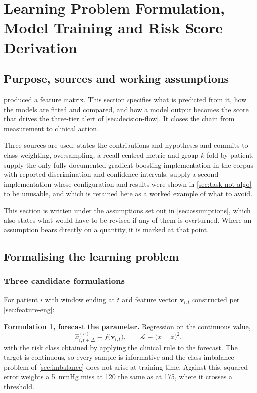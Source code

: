 \documentclass[12pt,a4paper,oneside]{report}
\begin{document}
\section{Learning Problem Formulation, Model Training and Risk Score Derivation}\label{sec:learning}

\subsection*{Purpose, sources and working assumptions}

 produced a feature matrix. This section specifies what is predicted from it, how the models are fitted and compared, and how a model output becomes the score that drives the three-tier alert of \cref{sec:decision-flow}. It closes the chain from measurement to clinical action.

Three sources are used. \Textcite{cadrage2026} states the contributions and hypotheses and commits to class weighting, oversampling, a recall-centred metric and group $k$-fold by patient. \Textcite{mendoza2025} supply the only fully documented gradient-boosting implementation in the corpus with reported discrimination and confidence intervals. \Textcite{efendi2025} supply a second implementation whose configuration and results were shown in \cref{sec:task-not-algo} to be unusable, and which is retained here as a worked example of what to avoid.

This section is written under the assumptions set out in \cref{sec:assumptions}, which also states what would have to be revised if any of them is overturned. Where an assumption bears directly on a quantity, it is marked at that point.

\subsection{Formalising the learning problem}\label{sec:formulation}

\subsubsection{Three candidate formulations}

For patient $i$ with window ending at $t$ and feature vector $\mathbf{v}_{i,t}$ constructed per \cref{sec:feature-eng}:

\textbf{Formulation 1, forecast the parameter.} Regression on the continuous value,
\begin{equation}
  \hat{x}^{(c)}_{i,t+\Delta} = f\bigl(\mathbf{v}_{i,t}\bigr),
  \qquad \mathcal{L} = \bigl(\hat{x} - x\bigr)^2,
\end{equation}
with the risk class obtained by applying the clinical rule to the forecast. The target is continuous, so every sample is informative and the class-imbalance problem of \cref{sec:imbalance} does not arise at training time. Against this, squared error weights a 5~mmHg miss at 120 the same as at 175, where it crosses a threshold.
\end{document}
